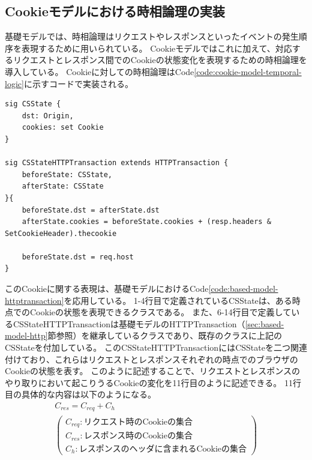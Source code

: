 \documentclass[12pt,a4paper]{jbook}
\begin{document}
\subsection{Cookieモデルにおける時相論理の実装}
基礎モデルでは、時相論理はリクエストやレスポンスといったイベントの発生順序を表現するために用いられている。
Cookieモデルではこれに加えて、対応するリクエストとレスポンス間でのCookieの状態変化を表現するための時相論理を導入している。
Cookieに対しての時相論理はCode\ref{code:cookie-model-temporal-logic}に示すコードで実装される。
\begin{lstlisting}[caption=Cookieに対する時相論理, label=code:cookie-model-temporal-logic]
sig CSState {
	dst: Origin,
	cookies: set Cookie
}

sig CSStateHTTPTransaction extends HTTPTransaction {
	beforeState: CSState,
	afterState: CSState
}{
	beforeState.dst = afterState.dst
	afterState.cookies = beforeState.cookies + (resp.headers & SetCookieHeader).thecookie
	
	beforeState.dst = req.host
}
\end{lstlisting}
このCookieに関する表現は、基礎モデルにおけるCode\ref{code:based-model-httptransaction}を応用している。
1-4行目で定義されているCSStateは、ある時点でのCookieの状態を表現できるクラスである。
また、6-14行目で定義しているCSStateHTTPTransactionは基礎モデルのHTTPTransaction（\ref{sec:based-model-http}節参照）を継承しているクラスであり、既存のクラスに上記のCSStateを付加している。
このCSStateHTTPTransactionにはCSStateを二つ関連付けており、これらはリクエストとレスポンスそれぞれの時点でのブラウザのCookieの状態を表す。
このように記述することで、リクエストとレスポンスのやり取りにおいて起こりうるCookieの変化を11行目のように記述できる。
11行目の具体的な内容は以下のようになる。
\begin{eqnarray*}
& C_{res} = C_{req} + C_{h} &\\
& \left(
\begin{array}{l}
	C_{req} : \mbox{リクエスト時のCookieの集合}\\
	C_{res} : \mbox{レスポンス時のCookieの集合}\\
	C_{h} : \mbox{レスポンスのヘッダに含まれるCookieの集合}
\end{array}
\right) &
\end{eqnarray*}
\end{document}
